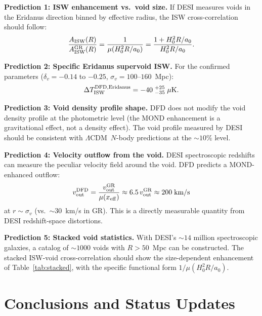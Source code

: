 \documentclass[11pt,a4paper]{article}
\newcounter{findingctr}
\newenvironment{finding}[1][]{%
  \refstepcounter{findingctr}%
  \begin{tcolorbox}[colback=blue!3!white, colframe=blue!50!black,
    title=\textbf{Finding \thefindingctr: #1}]
}{%
  \end{tcolorbox}%
}
\newcommand{\aM}{a_0}
\newcommand{\mufd}{\mu}
\newcommand{\LCDM}{$\Lambda$CDM}
\begin{document}
\begin{finding}[DESI DR2 Eridanus Void Predictions]
\label{find:DESI}
\textbf{Prediction 1: ISW enhancement vs.\ void size.}
If DESI measures voids in the Eridanus direction binned by effective
radius, the ISW cross-correlation should follow:
\begin{equation}
\frac{A_{\rm ISW}(R)}{A_{\rm ISW}^{\rm GR}(R)}
= \frac{1}{\mufd(H_0^2 R/\aM)}
= \frac{1 + H_0^2 R/\aM}{H_0^2 R/\aM}.
\end{equation}

\textbf{Prediction 2: Specific Eridanus supervoid ISW.}
For the confirmed parameters ($\delta_v = -0.14$ to $-0.25$,
$\sigma_v = 100$--$160$~Mpc):
\begin{equation}
\Delta T_{\rm ISW}^{\rm DFD,Eridanus}
= -40\;{}^{+25}_{-35}\;\mu\text{K}.
\end{equation}

\textbf{Prediction 3: Void density profile shape.}
DFD does not modify the void density profile at the photometric level
(the MOND enhancement is a gravitational effect, not a density effect).
The void profile measured by DESI should be consistent with \LCDM\
$N$-body predictions at the $\sim 10\%$ level.

\textbf{Prediction 4: Velocity outflow from the void.}
DESI spectroscopic redshifts can measure the peculiar velocity field
around the void. DFD predicts a MOND-enhanced outflow:
\begin{equation}
v_{\rm out}^{\rm DFD} = \frac{v_{\rm out}^{\rm GR}}
{\mufd(x_{\rm eff})}
\approx 6.5\,v_{\rm out}^{\rm GR}
\approx 200\;\text{km/s}
\end{equation}
at $r \sim \sigma_v$ (vs.\ $\sim 30$~km/s in GR). This is a
directly measurable quantity from DESI redshift-space distortions.

\textbf{Prediction 5: Stacked void statistics.}
With DESI's $\sim 14$ million spectroscopic galaxies, a catalog
of $\sim 1000$ voids with $R > 50$~Mpc can be constructed.
The stacked ISW-void cross-correlation should show the
size-dependent enhancement of Table~\ref{tab:stacked}, with the
specific functional form $1/\mufd(H_0^2 R/\aM)$.
\end{finding}


\part{Conclusions and Status Updates}
\label{part:conclusions}
\end{document}
